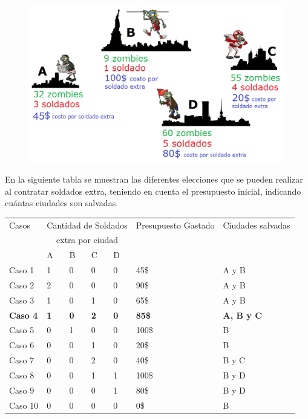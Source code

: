  \begin{figure}[h!]
   \begin{center}
 	\includegraphics[scale=0.6]{imagenes/ej1/ciudades.png}
   \end{center}
 \end{figure} 

\newpage
 En la siguiente tabla se muestran las diferentes elecciones que se pueden realizar al contratar soldados extra, teniendo en cuenta el presupuesto inicial, indicando cu\'antas ciudades son salvadas.

\begin{table}[htb]
\centering
\begin{tabular}[c]{|l|l|l|l|l|l|l|}

		\hline
		Casos &\multicolumn{4}{|c|}{Cantidad de Soldados}& Presupuesto Gastado & Ciudades salvadas\\
		&\multicolumn{4}{|c|}{extra por ciudad}& &  \\
		\cline{2-5}
		&  A  &  B  &  C  &  D  & & \\
		\hline
		Caso 1& 1 & 0 & 0 & 0 & 45\$ & A y B \\
		\hline
	    Caso 2& 2 & 0 & 0 & 0 & 90\$ & A y B \\
		\hline
		Caso 3& 1 & 0 & 1 & 0 & 65\$ & A y B \\
		\hline
		\textbf{Caso 4}& \textbf{1} &\textbf{ 0} & \textbf{2} & \textbf{0} & \textbf{85\$} & \textbf{A, B y C} \\
		\hline
		Caso 5& 0 & 1 & 0 & 0 & 100\$ & B \\
		\hline		
		Caso 6& 0 & 0 & 1 & 0 & 20\$ & B \\
		\hline
		Caso 7& 0 & 0 & 2 & 0 & 40\$ & B y C \\
		\hline
		Caso 8& 0 & 0 & 1 & 1 & 100\$ & B y D \\
		\hline
		Caso 9& 0 & 0 & 0 & 1 & 80\$ & B y D \\
		\hline
		Caso 10& 0 & 0 & 0 & 0 & 0\$ & B \\
		\hline
		
	\end{tabular}
\end{table}

